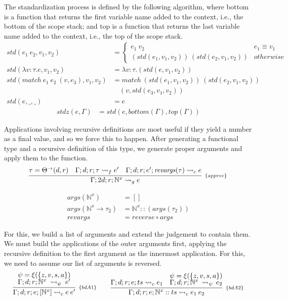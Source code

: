 \documentclass[runningheads]{llncs}
\newcommand{\tN}{\mathbb{N}}
\begin{document}
\noindent The standardization process is defined by the following algorithm, where bottom is a function that returns the first 
variable name 
added to the context, i.e., the bottom of the scope stack; 
and top is a function that returns the last variable name 
added to 
the context, i.e., the top of the scope stack. 
\begin{align*}
  std(e_1 \: e_2, v_1, v_2) &= 
  \begin{cases} 
      e_1 \: v_2 & e_1 \equiv v_1\\ 
      (std(e_1, v_1, v_2)) \: (std(e_2, v_1, v_2)) & \mathit{otherwise} 
  \end{cases}\\
  std(\lambda v:\tau.e, v_1, v_2) &= \lambda v:\tau.(std(e, v_1, v_2))\\
  std(match \: e_1 \: e_2 \: (v, e_3), v_1, v_2) &= match \: (std(e_1, v_1, v_2)) \: (std(e_2, v_1, v_2)) \\&\quad (v, std(e_3, v_1, v_2))\\
  std(e, \_, \_) &= e
\end{align*}
\begin{align*}
  stdz(e, \Gamma) &= std(e, \mathit{bottom}(\Gamma), \mathit{top}(\Gamma))
\end{align*}

\noindent Applications involving recursive definitions are most useful 
if they yield a number as a final value, and so we force this 
to happen. After generating a functional type and a recursive 
definition of this type, we 
generate proper arguments and apply them to the function.
\[
\begin{array}{c}
\infer[_{\{apprec\}}]{\Gamma; 2d; r; \tN^x \leadsto_g e}{\tau = \Theta^\rightarrow(d, r) & \Gamma; d; r; \tau \leadsto_f e' & \Gamma; d; r; e'; \mathit{revargs}(\tau) \leadsto_c e}
\end{array}
\]

\begin{align*}
\mathit{args}(\tN^x) &= []\\
\mathit{args}(\tN^x \rightarrow \tau_2) &= \tN^x :: (\mathit{args} (\tau_2))\\
\mathit{revargs} &= \mathit{reverse} \circ \mathit{args} 
\end{align*}

\noindent For this, we build a list of arguments and 
extend the judgement to contain them. We must build the 
applications of the outer arguments first, applying the recursive 
definition to the first argument as the innermost application. For this, 
we need to assume our list of arguments is reversed.
\[\arraycolsep=1em
\begin{array}{c c}
\infer[_{\{bdA1\}}]{\Gamma; d; r; e; [\tN^x] \leadsto_c e \: e'}{\psi = \xi(\{z, v, s, a\}) \\ \Gamma; d; r; \tN^x \leadsto_{\psi} e'} &
\infer[_{\{bdA2\}}]{\Gamma; d; r; e; \tN^x :: ts \leadsto_c e_1 \: e_2}{& \psi = \xi(\{z, v, s, a\})\\ \Gamma; d; r; e; ts \leadsto_c e_1 & \Gamma; d; r; \tN^x \leadsto_{\psi} e_2}
\end{array}
\]
\end{document}
